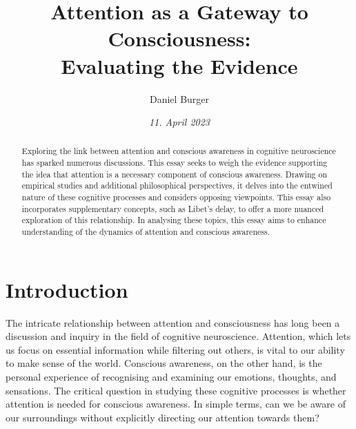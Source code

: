 \documentclass[10pt]{article}
\title{\textbf{Attention as a Gateway to Consciousness:} \\ Evaluating the Evidence}
\author[ ]{Daniel Burger}
\affil[ ]{\textbf{King’s College London}}
\affil[ ]{\href{mailto:daniel.burger@kcl.ac.uk}{daniel.burger@kcl.ac.uk}}
\date{\textit{11. April 2023}}
\begin{document}

\maketitle
\thispagestyle{empty}

\begin{sloppypar} %
  \begin{abstract}
    Exploring the link between attention and conscious awareness in cognitive neuroscience has sparked numerous discussions. This essay seeks to weigh the evidence supporting the idea that attention is a necessary component of conscious awareness. Drawing on empirical studies and additional philosophical perspectives, it delves into the entwined nature of these cognitive processes and considers opposing viewpoints. This essay also incorporates supplementary concepts, such as  Libet’s delay, to offer a more nuanced exploration of this relationship. In analysing these topics, this essay aims to enhance understanding of the dynamics of attention and conscious awareness.

  \end{abstract}
  \pagebreak

  \tableofcontents
  \pagebreak

  \listoffigures
  \pagebreak

  \listoftables
  \pagebreak


  \doublespacing

  \section{Introduction}
  \label{sec:introduction}

  The intricate relationship between attention and consciousness has long been a discussion and inquiry in the field of cognitive neuroscience. Attention, which lets us focus on essential information while filtering out others, is vital to our ability to make sense of the world. Conscious awareness, on the other hand, is the personal experience of recognising and examining our emotions, thoughts, and sensations. The critical question in studying these cognitive processes is whether attention is needed for conscious awareness. In simple terms, can we be aware of our surroundings without explicitly directing our attention towards them?


\end{sloppypar}
\end{document}
